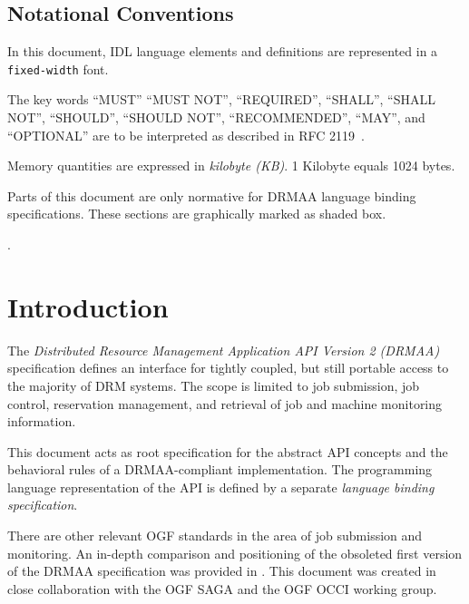 \documentclass{article}
\newcommand{\h}[1]{\lstinline|#1|}
\newcommand{\langbind}[1]{\begin{shaded}#1\end{shaded}}
\newcommand{\rat}[1]{}
\begin{document}
\newpage

\subsection*{Notational Conventions}
\label{sec:rfc2119}

In this document, IDL language elements and definitions are represented in a \h{fixed-width} font. 

The key words \enquote{MUST} \enquote{MUST NOT}, \enquote{REQUIRED}, \enquote{SHALL}, \enquote{SHALL NOT}, \enquote{SHOULD}, \enquote{SHOULD NOT}, \enquote{RECOMMENDED}, \enquote{MAY},  and \enquote{OPTIONAL} are to be interpreted as described in RFC 2119~\cite{rfc2119}. 

Memory quantities are expressed in \emph{kilobyte (KB)}. 1 Kilobyte equals 1024 bytes. 

\langbind{
Parts of this document are only normative for DRMAA language binding specifications. These sections are graphically marked as shaded box.
}

\rat{The usage of kikibyte as memory quantity unit, as well as the usage of bytes as in JSDL, was rejected by the group (conf call Apr. 13th 2011)}. 

\newpage
\tableofcontents
\newpage

\section{Introduction}
\label{sec:introduction}

 The \emph{Distributed Resource Management Application API Version 2 (DRMAA)} specification defines an interface for tightly coupled, but still portable access to the majority of DRM systems. The scope is limited to job submission, job control, reservation management, and retrieval of job and machine monitoring information. 

This document acts as root specification for the abstract API concepts and the behavioral rules of a DRMAA-compliant implementation. The programming language representation of the API is defined by a separate \emph{language binding specification}.  

There are other relevant OGF standards in the area of job submission and monitoring. An in-depth comparison and positioning of the obsoleted first version of the DRMAA \cite{gfd.133} specification was provided in \cite{drmaa09}. This document was created in close collaboration with the OGF SAGA and the OGF OCCI working group.
\end{document}
